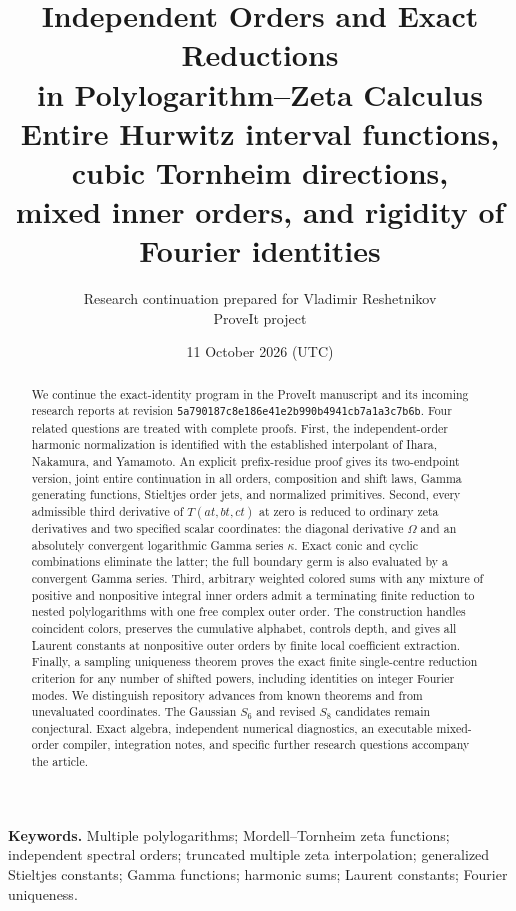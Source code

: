 \documentclass[11pt]{article}
\title{Independent Orders and Exact Reductions\\in Polylogarithm--Zeta Calculus\\[7pt]
\large Entire Hurwitz interval functions, cubic Tornheim directions,\\mixed inner orders, and rigidity of Fourier identities}
\author{Research continuation prepared for Vladimir Reshetnikov\\\small ProveIt project}
\date{11 October 2026 (UTC)}
\numberwithin{equation}{section}
\theoremstyle{plain}
\theoremstyle{definition}
\theoremstyle{remark}
\begin{document}
\maketitle

\begin{abstract}
We continue the exact-identity program in the ProveIt manuscript and its
incoming research reports at revision
\texttt{5a790187c8e186e41e2b990b4941cb7a1a3c7b6b}.
Four related questions are treated with complete proofs.
First, the independent-order harmonic normalization is identified with
the established interpolant of Ihara, Nakamura, and Yamamoto. An explicit
prefix-residue proof gives its two-endpoint version, joint entire
continuation in all orders, composition and shift laws, Gamma generating
functions, Stieltjes order jets, and normalized primitives.
Second, every admissible third derivative of
$T(at,bt,ct)$ at zero is reduced to ordinary zeta derivatives and two
specified scalar coordinates: the diagonal derivative $\Omega$ and an
absolutely convergent logarithmic Gamma series $\kappa$. Exact conic and
cyclic combinations eliminate the latter; the full boundary germ is
also evaluated by a convergent Gamma series.
Third, arbitrary weighted colored sums with any mixture of positive
and nonpositive integral inner orders admit a terminating finite
reduction to nested polylogarithms with one free complex outer order.
The construction handles coincident colors, preserves the cumulative
alphabet, controls depth, and gives all Laurent constants at
nonpositive outer orders by finite local coefficient extraction.
Finally, a sampling uniqueness theorem proves the exact finite
single-centre reduction criterion for any number of shifted powers,
including identities on integer Fourier modes.
We distinguish repository advances from known theorems and from
unevaluated coordinates. The Gaussian $S_6$ and revised $S_8$ candidates
remain conjectural. Exact algebra, independent numerical diagnostics,
an executable mixed-order compiler, integration notes, and specific
further research questions accompany the article.
\end{abstract}

\noindent\textbf{Keywords.}
Multiple polylogarithms; Mordell--Tornheim zeta functions; independent
spectral orders; truncated multiple zeta interpolation; generalized
Stieltjes constants; Gamma functions; harmonic sums; Laurent constants;
Fourier uniqueness.

\end{document}
